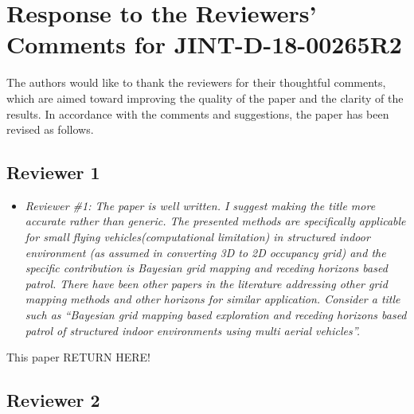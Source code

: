 \documentclass[11pt]{article}
\begin{document}

\section*{Response to the Reviewers' Comments for JINT-D-18-00265R2}

The authors would like to thank the reviewers for their thoughtful comments, which are aimed toward improving the quality of the paper and the clarity of the results. In accordance with the comments and suggestions, the paper has been revised as follows. 


\subsection*{Reviewer 1}
\begin{itemize}
\item {\itshape Reviewer \#1: The paper is well written. I suggest making the title more accurate rather than generic. The presented methods are specifically applicable for small flying vehicles(computational limitation) in structured indoor environment (as assumed in converting 3D to 2D occupancy grid) and the specific contribution is Bayesian grid mapping and receding horizons based patrol. There have been other papers in the literature addressing other grid mapping methods and other horizons for similar application. Consider a title such as ``Bayesian grid mapping based exploration and receding horizons based patrol of structured indoor environments using multi aerial vehicles''.} 
\end{itemize}

This paper RETURN HERE!

\subsection*{Reviewer 2}

\setlength{\leftmargini}{0pt}
\end{document}
